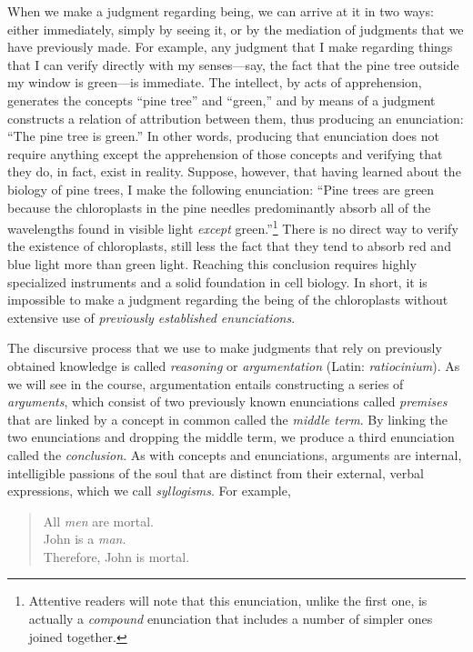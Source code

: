 \documentclass[
  12pt,
]{memoir}
\begin{document}
When we make a judgment regarding being, we can arrive at it in two
ways: either immediately, simply by seeing it, or by the mediation of
judgments that we have previously made. For example, any judgment that I
make regarding things that I can verify directly with my senses---say,
the fact that the pine tree outside my window is green---is immediate.
The intellect, by acts of apprehension, generates the concepts ``pine
tree'' and ``green,'' and by means of a judgment constructs a relation
of attribution between them, thus producing an enunciation: ``The pine
tree is green.'' In other words, producing that enunciation does not
require anything except the apprehension of those concepts and verifying
that they do, in fact, exist in reality. Suppose, however, that having
learned about the biology of pine trees, I make the following
enunciation: ``Pine trees are green because the chloroplasts in the pine
needles predominantly absorb all of the wavelengths found in visible
light \emph{except} green.''\footnote{Attentive readers will note that
  this enunciation, unlike the first one, is actually a \emph{compound}
  enunciation that includes a number of simpler ones joined together.}
There is no direct way to verify the existence of chloroplasts, still
less the fact that they tend to absorb red and blue light more than
green light. Reaching this conclusion requires highly specialized
instruments and a solid foundation in cell biology. In short, it is
impossible to make a judgment regarding the being of the chloroplasts
without extensive use of \emph{previously established enunciations}.

The discursive process that we use to make judgments that rely on
previously obtained knowledge is called \emph{reasoning} or
\emph{argumentation} (Latin: \emph{ratiocinium}). As we will see in the
course, argumentation entails constructing a series of \emph{arguments},
which consist of two previously known enunciations called
\emph{premises} that are linked by a concept in common called the
\emph{middle term}. By linking the two enunciations and dropping the
middle term, we produce a third enunciation called the
\emph{conclusion}. As with concepts and enunciations, arguments are
internal, intelligible passions of the soul that are distinct from their
external, verbal expressions, which we call \emph{syllogisms}. For
example,

\begin{quote}
All \emph{men} are mortal.\\
John is a \emph{man}.\\
Therefore, John is mortal.
\end{quote}
\end{document}
